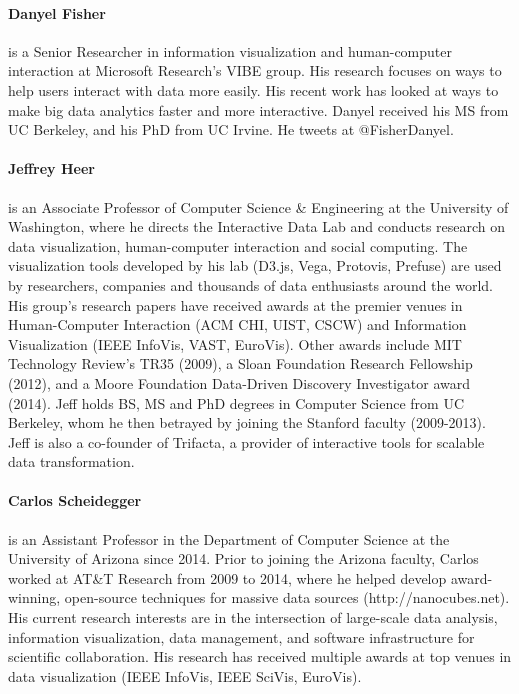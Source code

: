 \documentclass[journal]{vgtc}                %
\begin{document}
\paragraph*{Danyel Fisher} is a Senior Researcher in information visualization and human-computer interaction at Microsoft Research's VIBE group. His research focuses on ways to help users interact with data more easily. His recent work has looked at ways to make big data analytics faster and more interactive. Danyel received his MS from UC Berkeley, and his PhD from UC Irvine. He tweets at @FisherDanyel.

\paragraph*{Jeffrey Heer} is an Associate Professor of Computer Science \& Engineering at the University of Washington, where he directs the Interactive Data Lab and conducts research on data visualization, human-computer interaction and social computing. The visualization tools developed by his lab (D3.js, Vega, Protovis, Prefuse) are used by researchers, companies and thousands of data enthusiasts around the world. His group's research papers have received awards at the premier venues in Human-Computer Interaction (ACM CHI, UIST, CSCW) and Information Visualization (IEEE InfoVis, VAST, EuroVis). Other awards include MIT Technology Review's TR35 (2009), a Sloan Foundation Research Fellowship (2012), and a Moore Foundation Data-Driven Discovery Investigator award (2014). Jeff holds BS, MS and PhD degrees in Computer Science from UC Berkeley, whom he then betrayed by joining the Stanford faculty (2009-2013). Jeff is also a co-founder of Trifacta, a provider of interactive tools for scalable data transformation.

\paragraph*{Carlos Scheidegger} is an Assistant Professor in the Department of Computer Science at the University of Arizona since 2014. Prior to joining the Arizona faculty, Carlos worked at AT\&T Research from 2009 to 2014, where he helped develop award-winning, open-source techniques for massive data sources (http://nanocubes.net). His current research interests are in the intersection of large-scale data analysis, information visualization, data management, and software infrastructure for scientific collaboration. His research has received multiple awards at top venues in data visualization (IEEE InfoVis, IEEE SciVis, EuroVis).



\end{document}
